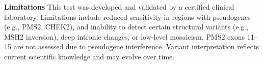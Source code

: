 \documentclass[11pt]{extarticle}
\begin{document}
{\large \bf Limitations \newline}
This test was developed and validated by a certified clinical laboratory. Limitations include reduced sensitivity in regions with pseudogenes (e.g., PMS2, CHEK2), and inability to detect certain structural variants (e.g., MSH2 inversion), deep intronic changes, or low-level mosaicism. PMS2 exons 11–15 are not assessed due to pseudogene interference. Variant interpretation reflects current scientific knowledge and may evolve over time.
\end{document}
